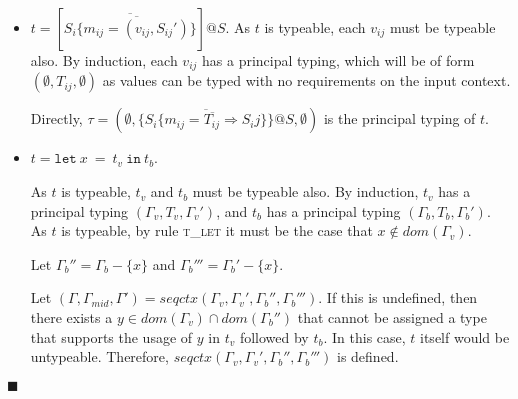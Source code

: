 \documentclass[preprint]{sigplanconf}
\newcommand{\lemref}[1]{Lemma \ref{#1}}
\newcommand{\tfundef}{\textsc{t\_fun\_def} }
\newcommand{\tlet}{\textsc{t\_let} }
\newcommand{\tfunc}{\textsc{t\_fun\_call} }
\newcommand{\twiden}{\textsc{t\_widen} }
\newcommand{\funt}[3]{(\overline{#1 \gg #2}) \rightarrow #3}
\newcommand{\lett}[3]{\mathtt{let}\:#1\:\mathtt{=}\:#2\:\mathtt{in}\:#3}
\newcommand{\qed}{$\blacksquare$}
\newenvironment{proof}{\vspace{1ex}\noindent{\bf Proof}\hspace{0.5em}}
  {\hfill\qed\vspace{1ex}}
\begin{document}
\begin{proof}
\begin{itemize}
%




\item $t = \left[ \overline{S_i \{ \overline{ m_{ij} = (v_{ij},S_{ij}') } \} } \right]@S$.
As $t$ is typeable, each $v_{ij}$ must be typeable also.
By induction, each $v_{ij}$ has a principal typing, which will be of
form $(\emptyset, T_{ij}, \emptyset)$
as values can be typed with no requirements on the input context.

Directly, 
$\tau = (\emptyset,\{ \overline{ S_i \{ \overline{ m_{ij} = T_{ij} \Rightarrow S_ij } \} } \}@S,\emptyset)$ is
the principal typing of $t$.

\item $t = \lett{x}{t_v}{t_b}$.

As $t$ is typeable, $t_v$ and $t_b$ must be typeable also.
By induction, $t_v$ has a principal typing $(\Gamma_v,T_v,\Gamma_v')$, and
$t_b$ has a principal typing $(\Gamma_b,T_b,\Gamma_b')$.
As $t$ is typeable, by rule \tlet it must be the case that 
$x \notin dom(\Gamma_v)$.

Let $\Gamma_b'' = \Gamma_b - \{x\}$ and
$\Gamma_b''' = \Gamma_b' - \{x\}$.

Let $(\Gamma, \Gamma_{mid}, \Gamma') = seqctx(\Gamma_v, \Gamma_v', \Gamma_b'', \Gamma_b''')$.
If this is undefined, then there exists a $y \in dom(\Gamma_v) \cap dom(\Gamma_b'')$
that cannot be assigned a type that supports the usage of $y$ in $t_v$
followed by $t_b$. In this case, $t$ itself would be untypeable. 
Therefore, $seqctx(\Gamma_v, \Gamma_v', \Gamma_b'', \Gamma_b''')$
is defined.


\end{itemize}
\end{proof}
\end{document}
